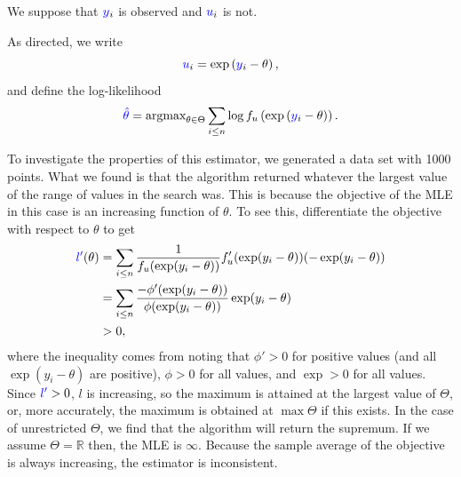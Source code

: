 \documentclass{article}
\renewcommand{\r}[1]{\textcolor{blue}{#1}}
\begin{document}
We suppose that $\r{y}_{i}$ is observed and $\r{u}_{i}$ is not. 

As directed, we write
\begin{equation} \r{u}_{i}=\exp\left(\r{y}_{i}-\theta\right),\end{equation}
and define the log-likelihood
\begin{equation} \r{\hat{\theta}}=\text{argmax}_{\theta\in\Theta}\sum_{i\leq n}\log f_{u}\left(\exp\left(\r{y}_{i}-\theta\right)\right).\end{equation}

To investigate the properties of this estimator, we generated a data set with 1000 points. What we found is that the algorithm returned whatever the largest value of the range of values in the search was. This is because the objective of the MLE in this case is an increasing function of $\theta$. To see this, differentiate the objective with respect to $\theta$ to get
\begin{equation}\begin{split}
\r{l'}(\theta) &= \sum_{i\leq n} \frac{1}{f_{u}(\exp(y_{i}-\theta))}f'_{u}(\exp(y_{i}-\theta))(-\exp(y_{i}-\theta)) \\
&= \sum_{i\leq n}\frac{-\phi'(\exp(y_{i}-\theta))}{\phi(\exp(y_{i}-\theta))}\exp(y_{i}-\theta)\\
&>0,
\end{split}\end{equation}
where the inequality comes from noting that $\phi'>0$ for positive values (and all $\exp(y_{i}-\theta)$ are positive), $\phi>0$ for all values, and $\exp>0$ for all values. Since $\r{l'}>0$, $l$ is increasing, so the maximum is attained at the largest value of $\Theta$, or, more accurately, the maximum is obtained at $\max\Theta$ if this exists. In the case of unrestricted $\Theta$, we find that the algorithm will return the supremum. If we assume $\Theta=\mathbb{R}$ then, the MLE is $\infty$. Because the sample average of the objective is always increasing, the estimator is inconsistent.
\end{document}
